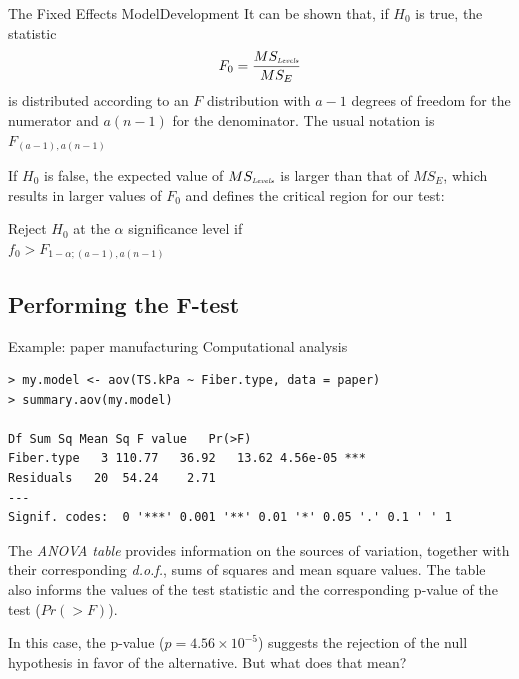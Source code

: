 %
%
\begin{frame}{The Fixed Effects Model}{Development}
It can be shown that, if $H_0$ is true, the statistic
\begin{equation*}
F_0 = \frac{MS_{\mbox{\tiny\textit{Levels}}}}{MS_E}
\end{equation*}
is distributed according to an $F$ distribution with $a-1$ degrees of freedom for the numerator and $a(n-1)$ for the denominator.  The usual notation is $F_{\left(a-1\right),a(n-1)}$
\bigskip

If $H_0$ is false, the expected value of $MS_{\mbox{\tiny\textit{Levels}}}$ is larger than that of $MS_E$, which results in larger values of $F_0$ and defines the critical region for our test:
\begin{block}{}
\centering Reject $H_0$ at the $\alpha$ significance level if\\$f_0>F_{1-\alpha;(a-1),a(n-1)}$
\end{block}
\end{frame}



%
%
\subsection{Performing the F-test}

\begin{frame}[fragile]
{Example: paper manufacturing}
{Computational analysis}

{\smaller
\begin{verbatim}
> my.model <- aov(TS.kPa ~ Fiber.type, data = paper)
> summary.aov(my.model)

Df Sum Sq Mean Sq F value   Pr(>F)
Fiber.type   3 110.77   36.92   13.62 4.56e-05 ***
Residuals   20  54.24    2.71
---
Signif. codes:  0 '***' 0.001 '**' 0.01 '*' 0.05 '.' 0.1 ' ' 1
\end{verbatim}}

The \textit{ANOVA table} provides information on the sources of variation, together with their corresponding \textit{d.o.f.}, sums of squares and mean square values. The table also informs the values of the test statistic and the corresponding p-value of the test ($Pr(>F)$).
\bigskip

In this case, the p-value ($p = 4.56\times 10^{-5}$) suggests the rejection of the null hypothesis in favor of the alternative. But what does that mean?
\end{frame}

